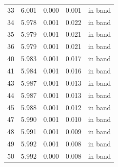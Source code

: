 \begin{table}[ht]
\begin{tabular}{rrrrl}
33 & 6.001 & 0.000 & 0.001 & in band \\
34 & 5.978 & 0.001 & 0.022 & in band \\
35 & 5.979 & 0.001 & 0.021 & in band \\
36 & 5.979 & 0.001 & 0.021 & in band \\
40 & 5.983 & 0.001 & 0.017 & in band \\
41 & 5.984 & 0.001 & 0.016 & in band \\
43 & 5.987 & 0.001 & 0.013 & in band \\
44 & 5.987 & 0.001 & 0.013 & in band \\
45 & 5.988 & 0.001 & 0.012 & in band \\
47 & 5.990 & 0.001 & 0.010 & in band \\
48 & 5.991 & 0.001 & 0.009 & in band \\
49 & 5.992 & 0.001 & 0.008 & in band \\
50 & 5.992 & 0.000 & 0.008 & in band \\
\hline
\end{tabular}
\end{table}

